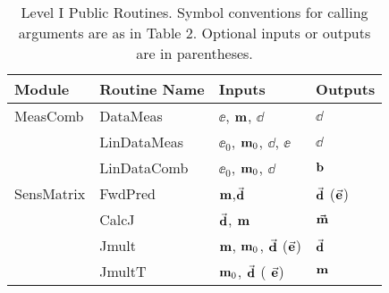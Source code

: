 \begin{table}

\caption{Level I Public Routines.  Symbol conventions
for calling arguments are as in Table 2.
Optional inputs or outputs are in parentheses.}
\label{t.LevelI}

\begin{tabular}{ l | l l l }
Module & Routine Name & Inputs & Outputs \\
\hline
MeasComb & DataMeas & $\ee$, ${\bf m}$, $\dd$ &$\dd$ \\ 
         & LinDataMeas & $\ee_0$, ${\bf m}_0$, $\dd$, $\ee$& $\dd$ \\
         & LinDataComb& $\ee_0$, ${\bf m}_0$, $\dd$&${\bf b}$ \\
SensMatrix & FwdPred & ${\bf m}$,$\vec{\bf d}$&$\vec{\bf d}$ ($\vec{\bf e}$)\\
         & CalcJ & $\vec{\bf d}$, ${\bf m}$ & $\vec{{\bf m}} $\\
         & Jmult & ${\bf m}$, ${\bf m}_0$, $\vec{\bf d}$ ($\vec{\bf e}$) & $\vec{\bf d}$  \\
         & JmultT & ${\bf m}_0$, $\vec{\bf d}$ ( $\vec{\bf e}$) &  ${\bf m}$ \\
\end{tabular}

\end{table}
